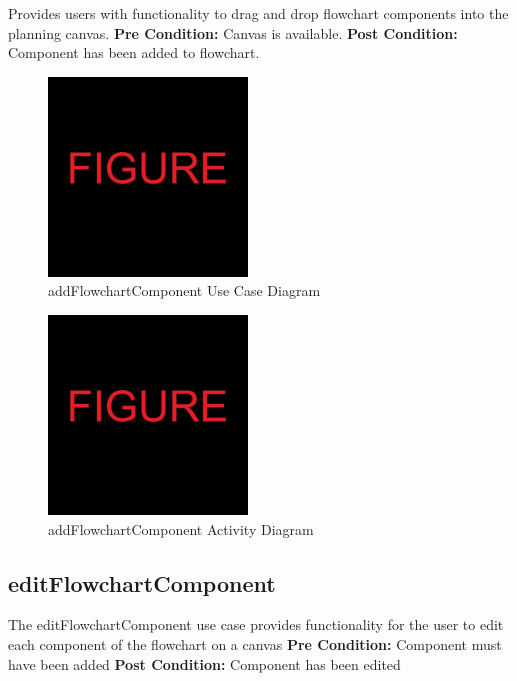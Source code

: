\documentclass[11pt,a4paper,titlepage]{article}
\begin{document}
Provides users with functionality to drag and drop flowchart components into the planning canvas.\newline\newline
\textbf{Pre Condition:} Canvas is available.\newline\newline
\textbf{Post Condition:} Component has been added to flowchart.

\begin{figure}[H]
  \centering
\includegraphics[width=200px]{figure.jpg}
\caption{addFlowchartComponent Use Case Diagram}
\end{figure}

\begin{figure}[H]
  \centering
\includegraphics[width=200px]{figure.jpg}
\caption{addFlowchartComponent Activity Diagram}
\end{figure}

\newpage
\subsection{editFlowchartComponent}

The editFlowchartComponent use case provides functionality for the user to edit each component of the flowchart on a canvas \newline\newline
\textbf{Pre Condition:} Component must have been added\newline\newline
\textbf{Post Condition:} Component has been edited
\end{document}
